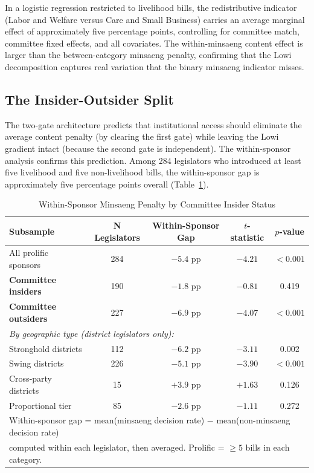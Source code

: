 \documentclass[11pt]{article}
\begin{document}
In a logistic regression restricted to livelihood bills, the redistributive indicator (Labor and Welfare versus Care and Small Business) carries an average marginal effect of approximately five percentage points, controlling for committee match, committee fixed effects, and all covariates. The within-minsaeng content effect is larger than the between-category minsaeng penalty, confirming that the Lowi decomposition captures real variation that the binary minsaeng indicator misses.

\subsection{The Insider-Outsider Split}

The two-gate architecture predicts that institutional access should eliminate the average content penalty (by clearing the first gate) while leaving the Lowi gradient intact (because the second gate is independent). The within-sponsor analysis confirms this prediction. Among 284 legislators who introduced at least five livelihood and five non-livelihood bills, the within-sponsor gap is approximately five percentage points overall (Table~\ref{tab:within}).

\begin{table}[H]
\centering
\caption{Within-Sponsor Minsaeng Penalty by Committee Insider Status}
\label{tab:within}
\begin{tabular}{lcccc}
\toprule
Subsample & N Legislators & Within-Sponsor Gap & $t$-statistic & $p$-value \\
\midrule
All prolific sponsors & 284 & $-5.4$ pp & $-4.21$ & $<0.001$ \\
\textbf{Committee insiders} & 190 & $-1.8$ pp & $-0.81$ & 0.419 \\
\textbf{Committee outsiders} & 227 & $-6.9$ pp & $-4.07$ & $<0.001$ \\
\midrule
\multicolumn{5}{l}{\textit{By geographic type (district legislators only):}} \\
\quad Stronghold districts & 112 & $-6.2$ pp & $-3.11$ & 0.002 \\
\quad Swing districts & 226 & $-5.1$ pp & $-3.90$ & $<0.001$ \\
\quad Cross-party districts & 15 & $+3.9$ pp & $+1.63$ & 0.126 \\
\quad Proportional tier & 85 & $-2.6$ pp & $-1.11$ & 0.272 \\
\bottomrule
\multicolumn{5}{l}{\footnotesize Within-sponsor gap = mean(minsaeng decision rate) $-$ mean(non-minsaeng decision rate)} \\
\multicolumn{5}{l}{\footnotesize computed within each legislator, then averaged. Prolific = $\geq5$ bills in each category.} \\
\end{tabular}
\end{table}
\end{document}
